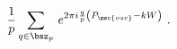\begin{equation}
\frac{1}{p}\sum_{q\in\bsz_p}\,e^{2\pi i \frac{q}{p}
\left(P_{\msc{osc}}-kW\right)}~.
\label{lm projection 1}
\end{equation}

